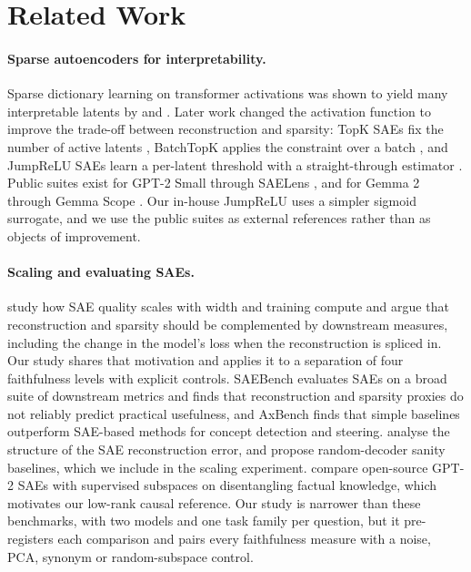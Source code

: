 \section{Related Work}\label{sec:related}

\paragraph{Sparse autoencoders for interpretability.} Sparse dictionary learning on transformer activations was shown
to yield many interpretable latents by \citet{bricken2023monosemanticity} and \citet{cunningham2023sparse}. Later work
changed the activation function to improve the trade-off between reconstruction and sparsity: TopK SAEs fix the number
of active latents \citep{gao2024scaling}, BatchTopK applies the constraint over a batch \citep{bussmann2024batchtopk}, and
JumpReLU SAEs learn a per-latent threshold with a straight-through estimator \citep{rajamanoharan2024jumping}. Public
suites exist for GPT-2 Small \citep{bloom2024gpt2} through SAELens \citep{saelens2024}, and for Gemma 2 through Gemma
Scope \citep{gemmascope2024}. Our in-house JumpReLU uses a simpler sigmoid surrogate, and we use the public suites as
external references rather than as objects of improvement.

\paragraph{Scaling and evaluating SAEs.} \citet{gao2024scaling} study how SAE quality scales with width and training
compute and argue that reconstruction and sparsity should be complemented by downstream measures, including the
change in the model's loss when the reconstruction is spliced in. Our study shares that motivation and applies it to a
separation of four faithfulness levels with explicit controls. SAEBench \citep{karvonen2025saebench} evaluates SAEs on
a broad suite of downstream metrics and finds that reconstruction and sparsity proxies do not reliably predict practical
usefulness, and AxBench \citep{wu2025axbench} finds that simple baselines outperform SAE-based methods for concept
detection and steering. \citet{engels2024darkmatter} analyse the structure of the SAE reconstruction error, and
\citet{korznikov2026random} propose random-decoder sanity baselines, which we include in the scaling experiment.
\citet{chaudhary2024evaluating} compare open-source GPT-2 SAEs with supervised subspaces on disentangling factual
knowledge, which motivates our low-rank causal reference. Our study is narrower than these benchmarks, with two models
and one task family per question, but it pre-registers each comparison and pairs every faithfulness measure with a
noise, PCA, synonym or random-subspace control.

